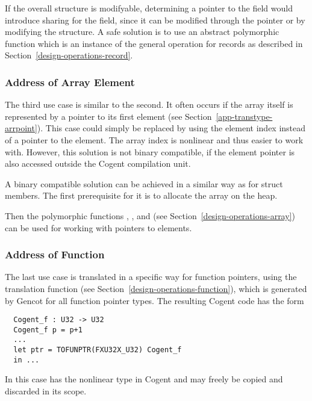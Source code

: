 If the overall structure is modifyable, determining a pointer to the field would introduce sharing for the
field, since it can be modified through the pointer or by modifying the structure. A safe solution is to use 
an abstract polymorphic function  which is an instance of the general  operation
for records as described in Section~\ref{design-operations-record}.

\subsubsection{Address of Array Element}

The third use case is similar to the second. It often occurs if the array itself is represented by a pointer to its first
element (see Section~\ref{app-transtype-arrpoint}). This case could simply be replaced by using the element index instead of a 
pointer to the element. The array index is nonlinear and thus easier to work with. However, this solution is not binary
compatible, if the element pointer is also accessed outside the Cogent compilation unit.

A binary compatible solution can be achieved in a similar way as for struct members. The first prerequisite for it is
to allocate the array on the heap.

Then the polymorphic functions , , and 
(see Section~\ref{design-operations-array}) can be used for working with pointers to elements.

\subsubsection{Address of Function}

The last use case is translated in a specific way for function pointers, using the translation function
 (see Section~\ref{design-operations-function}), which is generated by Gencot for all function
pointer types. The resulting Cogent code has the form
\begin{verbatim}
  Cogent_f : U32 -> U32
  Cogent_f p = p+1
  ...
  let ptr = TOFUNPTR(FXU32X_U32) Cogent_f
  in ...
\end{verbatim}
In this case  has the nonlinear type  in Cogent and may freely be copied and
discarded in its scope.

